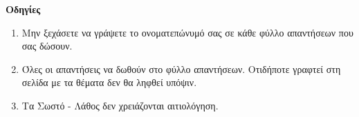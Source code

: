 \documentclass[10pt]{article}
\begin{document}
\vfill
 \textbf{Οδηγίες}
 \begin{enumerate}
   \item Μην ξεχάσετε να γράψετε το ονοματεπώνυμό σας σε κάθε φύλλο απαντήσεων που σας δώσουν.
   \item Όλες οι απαντήσεις να δωθούν στο φύλλο απαντήσεων. Οτιδήποτε γραφτεί στη σελίδα με τα θέματα δεν θα ληφθεί υπόψιν.
   \item Τα Σωστό - Λάθος δεν χρειάζονται αιτιολόγηση.
 \end{enumerate}
\end{document}
